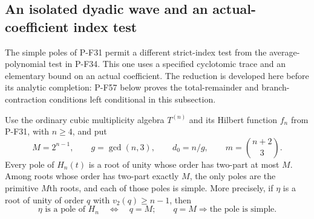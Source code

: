 \subsection{An isolated dyadic wave and an actual-coefficient index test}

The simple poles of P-F31 permit a different strict-index test from
the average-polynomial test in P-F34. This one uses a specified
cyclotomic trace and an elementary bound on an actual coefficient.
The reduction is developed here before its analytic completion:
P-F57 below proves the total-remainder and branch-contraction
conditions left conditional in this subsection.

\begin{proposition}
\label{prop:cubicpairedwave}
Use the ordinary cubic multiplicity algebra $T^{(n)}$ and its
Hilbert function $f_n$ from P-F31, with $n\ge4$, and put
\[
 M=2^{n-1},\qquad g=\gcd(n,3),\qquad d_0=n/g,
 \qquad m=\binom{n+2}{3}.
\]
Every pole of $H_n(t)$ is a root of unity whose order has
two-part at most $M$. Among roots whose order has two-part exactly
$M$, the only poles are the primitive $M$th roots, and each of
those poles is simple. More precisely, if $\eta$ is a root of
unity of order $q$ with $v_2(q)\ge n-1$, then
\[
 \eta\text{ is a pole of }H_n
       \quad\Longleftrightarrow\quad q=M;
 \qquad q=M\Longrightarrow\text{the pole is simple}.
 \tag{P-F56a}
\]


\end{proposition}
